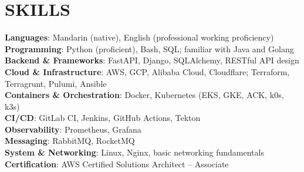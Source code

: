 \documentclass[letterpaper,11pt]{article}
\begin{document}
\section{SKILLS}
\begin{itemize}[leftmargin=0in, label={}]
\small{\item{
\textbf{Languages}{: Mandarin (native), English (professional working proficiency)} \\
\textbf{Programming}{: Python (proficient), Bash, SQL; familiar with Java and Golang} \\
\textbf{Backend \& Frameworks}{: FastAPI, Django, SQLAlchemy, RESTful API design} \\
\textbf{Cloud \& Infrastructure}{: AWS, GCP, Alibaba Cloud, Cloudflare; Terraform, Terragrunt, Pulumi, Ansible} \\
\textbf{Containers \& Orchestration}{: Docker, Kubernetes (EKS, GKE, ACK, k0s, k3s)} \\
\textbf{CI/CD}{: GitLab CI, Jenkins, GitHub Actions, Tekton} \\
\textbf{Observability}{: Prometheus, Grafana} \\
\textbf{Messaging}{: RabbitMQ, RocketMQ} \\
\textbf{System \& Networking}{: Linux, Nginx, basic networking fundamentals} \\
\textbf{Certification}{: AWS Certified Solutions Architect – Associate}

}}
\end{itemize}


\end{document}

